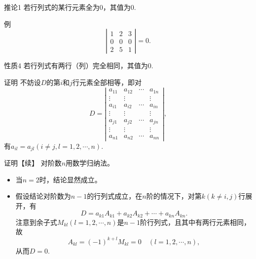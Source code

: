 \begin{frame}
  \begin{block}{推论1}
    若行列式的某行元素全为0，其值为0.
  \end{block}
  \pause 
  \begin{exampleblock}{例}
    $$
    \left|
    \begin{array}{ccc}
      1 & 2 & 3\\
      0 & 0 & 0\\
      2 & 5 & 1
    \end{array}
    \right| = 0.
    $$
  \end{exampleblock}
\end{frame}


\begin{frame}
  \begin{block}{性质4}
    若行列式有两行（列）完全相同，其值为$0$.
  \end{block}
  \pause 
  \begin{block}{证明}
    不妨设$D$的第$i$和$j$行元素全部相等，即对
    $$
    D = \left|
    \begin{array}{cccc}
      a_{11}  &  a_{12} & \cdots & a_{1n} \\
      \vdots & \vdots &  & \vdots\\  
      a_{i1}  &  a_{i2} & \cdots & a_{in} \\
      \vdots & \vdots &  & \vdots\\  
      a_{j1}  &  a_{j2} & \cdots & a_{jn} \\
      \vdots & \vdots &  & \vdots\\  
      a_{n1}  &  a_{n2} & \cdots & a_{nn} 
    \end{array}
    \right|,
    $$
    有$a_{il}=a_{jl}(i\ne j, l=1,2,\cdots,n)$.
  \end{block}
\end{frame}

\begin{frame}
  \begin{block}{证明【续】}
    对阶数$n$用数学归纳法。
    \begin{itemize}
    \item 当$n=2$时，结论显然成立。\pause 
    \item 假设结论对阶数为$n-1$的行列式成立，在$n$阶的情况下，对第$k(k\ne i, j)$行展开，有
      $$
      D = a_{k1} A_{k1} + a_{k2} A_{k2} + \cdots + a_{kn} A_{kn}. 
      $$ \pause 
      注意到余子式$M_{kl}(l=1,2,\cdots,n)$是$n-1$阶行列式，且其中有两行元素相同，故
      $$
      A_{kl} = (-1)^{k+l} M_{kl} = 0\quad (l=1,2,\cdots,n),
      $$
      从而$D=0$.
    \end{itemize}
  \end{block}
\end{frame}

